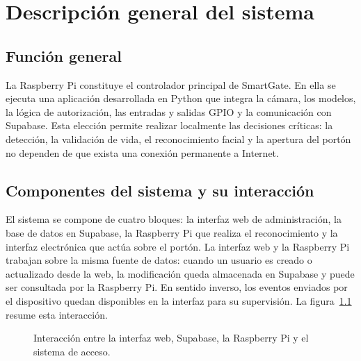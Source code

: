 \chapter{Descripción general del sistema}

\section{Función general}

La Raspberry Pi constituye el controlador principal de SmartGate. En ella se ejecuta una aplicación desarrollada en Python que integra la cámara, los modelos, la lógica de autorización, las entradas y salidas GPIO y la comunicación con Supabase. Esta elección permite realizar localmente las decisiones críticas: la detección, la validación de vida, el reconocimiento facial y la apertura del portón no dependen de que exista una conexión permanente a Internet.

\section{Componentes del sistema y su interacción}

El sistema se compone de cuatro bloques: la interfaz web de administración, la base de datos en Supabase, la Raspberry Pi que realiza el reconocimiento y la interfaz electrónica que actúa sobre el portón. La interfaz web y la Raspberry Pi trabajan sobre la misma fuente de datos: cuando un usuario es creado o actualizado desde la web, la modificación queda almacenada en Supabase y puede ser consultada por la Raspberry Pi. En sentido inverso, los eventos enviados por el dispositivo quedan disponibles en la interfaz para su supervisión. La figura~\ref{fig:interaccion} resume esta interacción.

\begin{figure}[H]
    \centering
    \caption{Interacción entre la interfaz web, Supabase, la Raspberry Pi y el sistema de acceso.}
    \label{fig:interaccion}
\end{figure}

